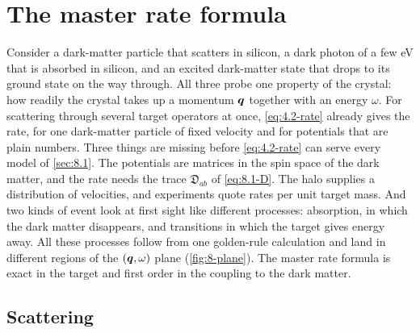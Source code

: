 \section{The master rate formula}\label{sec:8.2}

Consider a dark-matter particle that scatters in silicon, a dark photon of a few eV that is absorbed in silicon, and an excited dark-matter state that drops to its ground state on the way through. All three probe one property of the crystal: how readily the crystal takes up a momentum $\bm{q}$ together with an energy $\omega$. For scattering through several target operators at once, \cref{eq:4.2-rate} already gives the rate, for one dark-matter particle of fixed velocity and for potentials that are plain numbers. Three things are missing before \cref{eq:4.2-rate} can serve every model of \cref{sec:8.1}. The potentials are matrices in the spin space of the dark matter, and the rate needs the trace $\mathfrak{D}_{ab}$ of \cref{eq:8.1-D}. The halo supplies a distribution of velocities, and experiments quote rates per unit target mass. And two kinds of event look at first sight like different processes: absorption, in which the dark matter disappears, and transitions in which the target gives energy away. All these processes follow from one golden-rule calculation and land in different regions of the $(\bm{q}, \omega)$ plane (\cref{fig:8-plane}). The master rate formula is exact in the target and first order in the coupling to the dark matter.

\subsection{Scattering}\label{sec:8.2-scattering}

